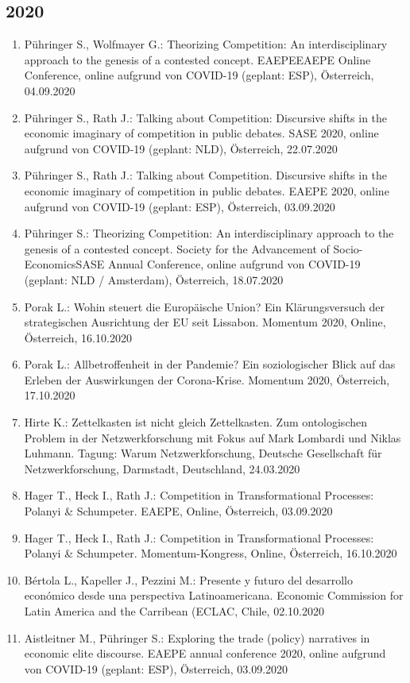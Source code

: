 \subsection*{2020}

\begin{enumerate}
	\item Pühringer S., Wolfmayer G.: Theorizing Competition: An interdisciplinary approach to the genesis of a contested concept. EAEPEEAEPE Online Conference, online aufgrund von COVID-19 (geplant: ESP), Österreich, 04.09.2020
	\item Pühringer S., Rath J.: Talking about Competition: Discursive shifts in the economic imaginary of competition in public debates. SASE 2020, online aufgrund von COVID-19 (geplant: NLD), Österreich, 22.07.2020
	\item Pühringer S., Rath J.: Talking about Competition. Discursive shifts in the economic imaginary of competition in public debates. EAEPE 2020, online aufgrund von COVID-19 (geplant: ESP), Österreich, 03.09.2020
	\item Pühringer S.: Theorizing Competition: An interdisciplinary approach to the genesis of a contested concept. Society for the Advancement of Socio-EconomicsSASE Annual Conference, online aufgrund von COVID-19 (geplant: NLD / Amsterdam), Österreich, 18.07.2020
	\item Porak L.: Wohin steuert die Europäische Union? Ein Klärungsversuch der strategischen Ausrichtung der EU seit Lissabon. Momentum 2020, Online, Österreich, 16.10.2020
	\item Porak L.: Allbetroffenheit in der Pandemie? Ein soziologischer Blick auf das Erleben der Auswirkungen der Corona-Krise. Momentum 2020, Österreich, 17.10.2020
	\item Hirte K.: Zettelkasten ist nicht gleich Zettelkasten. Zum ontologischen Problem in der Netzwerkforschung mit Fokus auf Mark Lombardi und Niklas Luhmann. Tagung: Warum Netzwerkforschung, Deutsche Gesellschaft für Netzwerkforschung, Darmstadt, Deutschland, 24.03.2020
	\item Hager T., Heck I., Rath J.: Competition in Transformational Processes: Polanyi \& Schumpeter. EAEPE, Online, Österreich, 03.09.2020
	\item Hager T., Heck I., Rath J.: Competition in Transformational Processes: Polanyi \& Schumpeter. Momentum-Kongress, Online, Österreich, 16.10.2020
	\item Bértola L., Kapeller J., Pezzini M.: Presente y futuro del desarrollo económico desde una perspectiva Latinoamericana. Economic Commission for Latin America and the Carribean (ECLAC, Chile, 02.10.2020
	\item Aistleitner M., Pühringer S.: Exploring the trade (policy) narratives in economic elite discourse. EAEPE annual conference 2020, online aufgrund von COVID-19 (geplant: ESP), Österreich, 03.09.2020
\end{enumerate}

